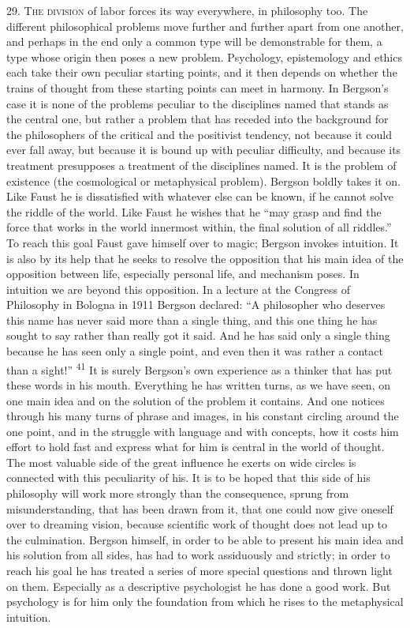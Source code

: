\documentclass[12pt,a4paper,openany]{book}
\newcommand{\opage}[1]{\marginnote{\footnotesize\textit{[#1]}}}
\newcommand{\initial}[2]{{\Large #1}\textsc{#2}}
\newcommand{\nm}[1]{\unskip\textsuperscript{#1}}
\begin{document}
\opage{52}29. \initial{T}{he division} of labor forces its way everywhere, in philosophy too. The different philosophical problems move further and further apart from one another, and perhaps in the end only a common type will be demonstrable for them, a type whose origin then poses a new problem. Psychology, epistemology and ethics each take their own peculiar starting points, and it then depends on whether the trains of thought from these starting points can meet in harmony. In Bergson's case it is none of the problems peculiar to the disciplines named that stands as the central one, but rather a problem that has receded into the background for the philosophers of the critical and the positivist tendency, not because it could ever fall away, but because it is bound up with peculiar difficulty, and because its treatment presupposes a treatment of the disciplines named. It is the problem of existence (the cosmological or metaphysical problem). Bergson boldly takes it on. Like Faust he is dissatisfied with whatever else can be known, if he cannot solve the riddle of the world. Like Faust he wishes that he ``may grasp and find the force that works in the world innermost within, the final solution of all riddles.'' To reach this goal Faust gave himself over to magic; Bergson invokes intuition. It is also by its help that he seeks to resolve the opposition that his main idea of the opposition between life, especially personal life, and mechanism poses. In intuition we are beyond this opposition.
\opage{53}In a lecture at the Congress of Philosophy in Bologna in 1911 Bergson declared: ``A philosopher who deserves this name has never said more than a single thing, and this one thing he has sought to say rather than really got it said. And he has said only a single thing because he has seen only a single point, and even then it was rather a contact than a sight!'' \nm{41} It is surely Bergson's own experience as a thinker that has put these words in his mouth. Everything he has written turns, as we have seen, on one main idea and on the solution of the problem it contains. And one notices through his many turns of phrase and images, in his constant circling around the one point, and in the struggle with language and with concepts, how it costs him effort to hold fast and express what for him is central in the world of thought. The most valuable side of the great influence he exerts on wide circles is connected with this peculiarity of his. It is to be hoped that this side of his philosophy will work more strongly than the consequence, sprung from misunderstanding, that has been drawn from it, that one could now give oneself over to dreaming vision, because scientific work of thought does not lead up to the culmination. Bergson himself, in order to be able to present his main idea and his solution from all sides, has had to work assiduously and strictly; in order to reach his goal he has treated a series of more special questions and thrown light on them. Especially as a descriptive psychologist he has done a good work. But psychology is for him only the foundation from which he rises to the metaphysical intuition.
\end{document}
